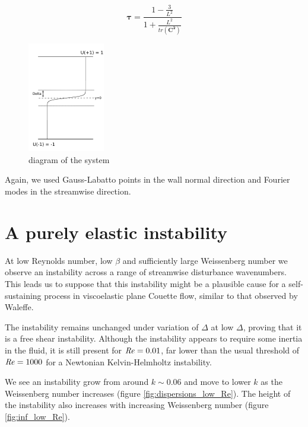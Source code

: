 \documentclass{jfm}
\newcommand\Rey{\mbox{\textit{Re}}}  %
\begin{document}
\begin{equation}
    \mathbf{\tau} = \frac{1-\frac{3}{L^{2}}}{1 + \frac{L^{2}}{tr(\mathbf{C^{2}})}}
\end {equation}

\begin{figure}
    \centering
    \includegraphics[width=0.3\textwidth]{KH_diagram}
    \caption{diagram of the system}
    \label{fig:diagram}
\end{figure}

Again, we used Gauss-Labatto points in the wall normal direction and Fourier
modes in the streamwise direction.

\section{A purely elastic instability}

At low Reynolds number, low $\beta$ and sufficiently large Weissenberg number
we observe an instability across a range of streamwise disturbance wavenumbers.
This leads us to suppose that this instability might be a plausible cause for a
self-sustaining process in viscoelastic plane Couette flow, similar to that
observed by Waleffe.

The instability remains unchanged under variation of $\Delta$ at low $\Delta$,
proving that it is a free shear instability. Although the instability appears
to require some inertia in the fluid, it is still present for  $\Rey = 0.01$,
far lower than the usual threshold of $\Rey = 1000$ for a Newtonian
Kelvin-Helmholtz instability.

We see an instability grow from around $k \sim 0.06$ and move to lower $k$ as
the Weissenberg number increases (figure \ref{fig:dispersions_low_Re}). The
height of the instability also increases with increasing Weissenberg number
(figure \ref{fig:inf_low_Re}). 
\end{document}
